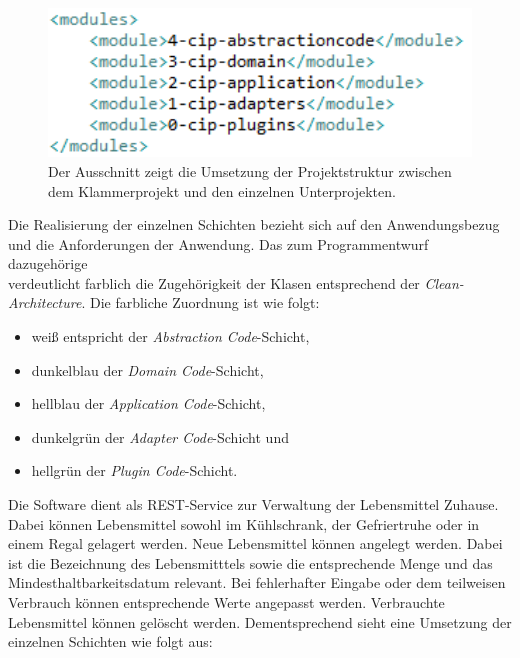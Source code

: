 \begin{figure}[H]
	\centering
	\includegraphics[width=1.0\textwidth]{Bilder/ausschnitt-pom.PNG}
	\caption[Ausschnitt aus der pom.xml zur Projektstruktur.]{Der Ausschnitt zeigt die Umsetzung der Projektstruktur zwischen dem Klammerprojekt und den einzelnen Unterprojekten.}
	\label{fig:umsetzung-pom}
\end{figure}

Die Realisierung der einzelnen Schichten bezieht sich auf den Anwendungsbezug und die Anforderungen der Anwendung.
Das zum Programmentwurf dazugehörige \\\href{https://github.com/lucasmerkel/dhbw-advancedswe-programmentwurf/blob/d5c89113d12c3b877ddc4d6a99225b277ddd468f/Documentation/Bilder/uml-diagramme/klassendiagramm.svg}{} verdeutlicht farblich die Zugehörigkeit der Klasen entsprechend der \textit{Clean-Architecture}.
Die farbliche Zuordnung ist wie folgt:
\begin{itemize}
    \item weiß entspricht der \textit{Abstraction Code}-Schicht,
    \item dunkelblau der \textit{Domain Code}-Schicht,
    \item hellblau der \textit{Application Code}-Schicht,
    \item dunkelgrün der \textit{Adapter Code}-Schicht und
    \item hellgrün der \textit{Plugin Code}-Schicht.
\end{itemize}


Die Software dient als \ac{REST}-Service zur Verwaltung der Lebensmittel Zuhause.
Dabei können Lebensmittel sowohl im Kühlschrank, der Gefriertruhe oder in einem Regal gelagert werden.
Neue Lebensmittel können angelegt werden.
Dabei ist die Bezeichnung des Lebensmitttels sowie die entsprechende Menge und das Mindesthaltbarkeitsdatum relevant.
Bei fehlerhafter Eingabe oder dem teilweisen Verbrauch können entsprechende Werte angepasst werden.
Verbrauchte Lebensmittel können gelöscht werden.
Dementsprechend sieht eine Umsetzung der einzelnen Schichten wie folgt aus:

